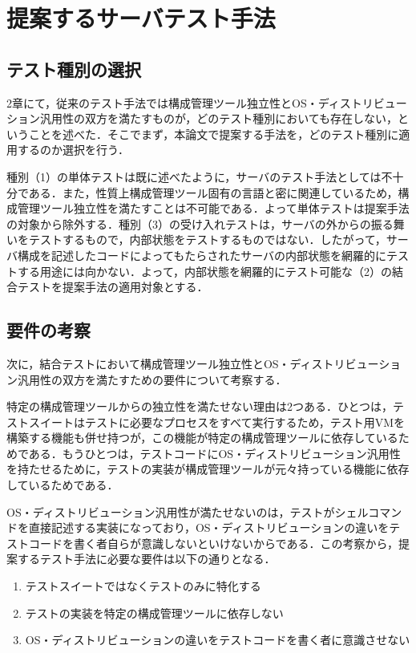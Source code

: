 \section{提案するサーバテスト手法}

\subsection{テスト種別の選択}

2章にて，従来のテスト手法では構成管理ツール独立性とOS・ディストリビューション汎用性の双方を満たすものが，どのテスト種別においても存在しない，ということを述べた．そこでまず，本論文で提案する手法を，どのテスト種別に適用するのか選択を行う．

種別（1）の単体テストは既に述べたように，サーバのテスト手法としては不十分である．また，性質上構成管理ツール固有の言語と密に関連しているため，構成管理ツール独立性を満たすことは不可能である．よって単体テストは提案手法の対象から除外する．種別（3）の受け入れテストは，サーバの外からの振る舞いをテストするもので，内部状態をテストするものではない．したがって，サーバ構成を記述したコードによってもたらされたサーバの内部状態を網羅的にテストする用途には向かない．よって，内部状態を網羅的にテスト可能な（2）の結合テストを提案手法の適用対象とする．

\subsection{要件の考察}

次に，結合テストにおいて構成管理ツール独立性とOS・ディストリビューション汎用性の双方を満たすための要件について考察する．

特定の構成管理ツールからの独立性を満たせない理由は2つある．ひとつは，テストスイートはテストに必要なプロセスをすべて実行するため，テスト用VMを構築する機能も併せ持つが，この機能が特定の構成管理ツールに依存しているためである．もうひとつは，テストコードにOS・ディストリビューション汎用性を持たせるために，テストの実装が構成管理ツールが元々持っている機能に依存しているためである．

OS・ディストリビューション汎用性が満たせないのは，テストがシェルコマンドを直接記述する実装になっており，OS・ディストリビューションの違いをテストコードを書く者自らが意識しないといけないからである．この考察から，提案するテスト手法に必要な要件は以下の通りとなる．

\begin{enumerate}
  \item テストスイートではなくテストのみに特化する
  \item テストの実装を特定の構成管理ツールに依存しない
  \item OS・ディストリビューションの違いをテストコードを書く者に意識させない
\end{enumerate}

